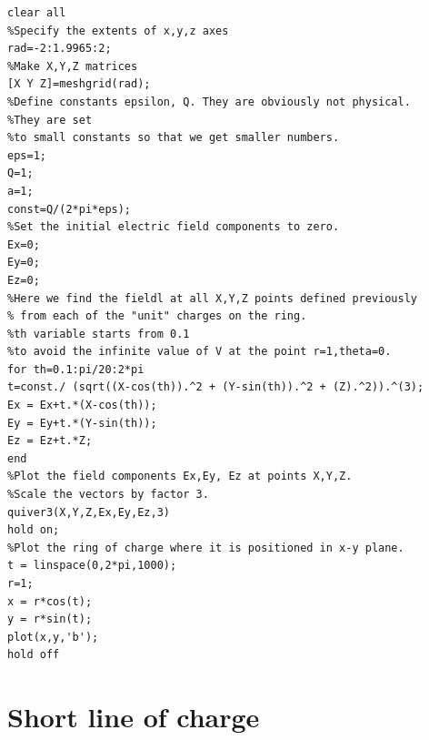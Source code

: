 \documentclass{ximera}
\begin{document}
\begin{verbatim}
clear all
%Specify the extents of x,y,z axes
rad=-2:1.9965:2;
%Make X,Y,Z matrices
[X Y Z]=meshgrid(rad);
%Define constants epsilon, Q. They are obviously not physical. 
%They are set
%to small constants so that we get smaller numbers.
eps=1;
Q=1;
a=1;
const=Q/(2*pi*eps);
%Set the initial electric field components to zero. 
Ex=0;
Ey=0;
Ez=0;
%Here we find the fieldl at all X,Y,Z points defined previously
% from each of the "unit" charges on the ring. 
%th variable starts from 0.1
%to avoid the infinite value of V at the point r=1,theta=0.
for th=0.1:pi/20:2*pi
t=const./ (sqrt((X-cos(th)).^2 + (Y-sin(th)).^2 + (Z).^2)).^(3);
Ex = Ex+t.*(X-cos(th));
Ey = Ey+t.*(Y-sin(th));
Ez = Ez+t.*Z;
end
%Plot the field components Ex,Ey, Ez at points X,Y,Z. 
%Scale the vectors by factor 3.
quiver3(X,Y,Z,Ex,Ey,Ez,3)
hold on;
%Plot the ring of charge where it is positioned in x-y plane.
t = linspace(0,2*pi,1000);
r=1;
x = r*cos(t);
y = r*sin(t);
plot(x,y,'b');
hold off
\end{verbatim}


\section{Short line of charge}
\end{document}
